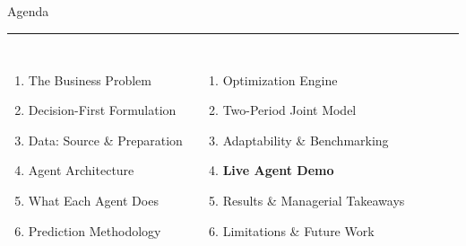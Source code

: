 \documentclass[aspectratio=169, 9pt]{beamer}
\newcommand{\goldrule}{\textcolor{PurdueGold}{\rule{\linewidth}{1.2pt}}}
\begin{document}
\begin{frame}{Agenda}
\goldrule
\vspace{4pt}
\begin{columns}[T]
\begin{enumerate}[label={\color{AgedGold}\bfseries\arabic*.}]
  \item The Business Problem
  \item Decision-First Formulation
  \item Data: Source \& Preparation
  \item Agent Architecture
  \item What Each Agent Does
  \item Prediction Methodology
\end{enumerate}
\begin{enumerate}[label={\color{AgedGold}\bfseries\arabic*.}, start=7]
  \item Optimization Engine
  \item Two-Period Joint Model
  \item Adaptability \& Benchmarking
  \item \textbf{Live Agent Demo}
  \item Results \& Managerial Takeaways
  \item Limitations \& Future Work
\end{enumerate}
\end{columns}
\vspace{8pt}
\end{frame}
\end{document}
